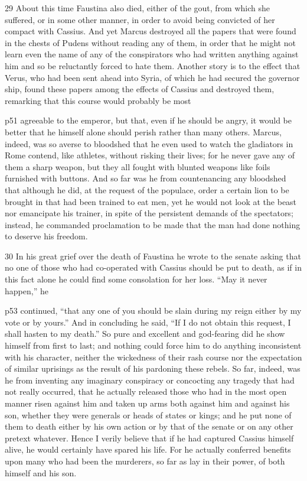 29
About this time Faustina also died, either of the gout, from which she suffered, or in some other manner, in order to avoid being convicted of her compact with Cassius. And yet Marcus destroyed all the papers that were found in the chests of Pudens\texthebrew{⁠} without reading any of them, in order that he might not learn even the name of any of the conspirators who had written anything against him and so be reluctantly forced to hate them. Another story is to the effect that Verus, who had been sent ahead into Syria, of which he had secured the governor ­ship, found these papers among the effects of Cassius and destroyed them, remarking that this course would probably be most

p51 agreeable to the emperor, but that, even if he should be angry, it would be better that he himself alone should perish rather than many others. Marcus, indeed, was so averse to bloodshed that he even used to watch the gladiators in Rome contend, like athletes, without risking their lives; for he never gave any of them a sharp weapon, but they all fought with blunted weapons like foils furnished with buttons. And so far was he from countenancing any bloodshed that although he did, at the request of the populace, order a certain lion to be brought in that had been trained to eat men, yet he would not look at the beast nor emancipate his trainer, in spite of the persistent demands of the spectators; instead, he commanded proclamation to be made that the man had done nothing to deserve his freedom.

30
In his great grief over the death of Faustina he wrote to the senate asking that no one of those who had co-operated with Cassius should be put to death, as if in this fact alone he could find some consolation for her loss.\texthebrew{⁠} ``May it never happen,'' he

p53 continued, ``that any one of you should be slain during my reign either by my vote or by yours.'' And in concluding he said, ``If I do not obtain this request, I shall hasten to my death.'' So pure and excellent and god-fearing did he show himself from first to last; and nothing could force him to do anything inconsistent with his character, neither the wickedness of their rash course nor the expectation of similar uprisings as the result of his pardoning these rebels.\texthebrew{⁠} So far, indeed, was he from inventing any imaginary conspiracy or concocting any tragedy that had not really occurred, that he actually released those who had in the most open manner risen against him and taken up arms both against him and against his son, whether they were generals or heads of states or kings; and he put none of them to death either by his own action or by that of the senate or on any other pretext whatever. Hence I verily believe that if he had captured Cassius himself alive, he would certainly have spared his life. For he actually conferred benefits upon many who had been the murderers, so far as lay in their power, of both himself and his son.


